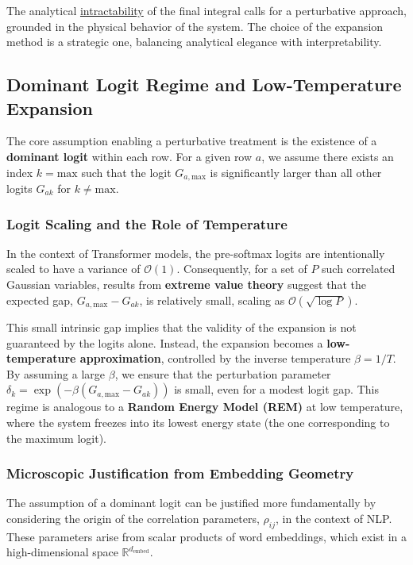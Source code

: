 \documentclass[12pt]{article}
\begin{document}
The analytical \underline{intractability} of the final integral calls for a perturbative approach, grounded in the physical behavior of the system. The choice of the expansion method is a strategic one, balancing analytical elegance with interpretability.

\subsection{Dominant Logit Regime and Low-Temperature Expansion}
The core assumption enabling a perturbative treatment is the existence of a \textbf{dominant logit} within each row. For a given row $a$, we assume there exists an index $k=\text{max}$ such that the logit $G_{a, \text{max}}$ is significantly larger than all other logits $G_{ak}$ for $k \neq \text{max}$.

\subsubsection*{Logit Scaling and the Role of Temperature}
In the context of Transformer models, the pre-softmax logits are intentionally scaled to have a variance of $\mathcal{O}(1)$. Consequently, for a set of $P$ such correlated Gaussian variables, results from \textbf{extreme value theory} suggest that the expected gap, $G_{a, \text{max}} - G_{ak}$, is relatively small, scaling as $\mathcal{O}(\sqrt{\log P})$.

This small intrinsic gap implies that the validity of the expansion is not guaranteed by the logits alone. Instead, the expansion becomes a \textbf{low-temperature approximation}, controlled by the inverse temperature $\beta = 1/T$. By assuming a large $\beta$, we ensure that the perturbation parameter $\delta_k = \exp(-\beta(G_{a, \text{max}} - G_{ak}))$ is small, even for a modest logit gap. This regime is analogous to a \textbf{Random Energy Model (REM)} at low temperature, where the system freezes into its lowest energy state (the one corresponding to the maximum logit).
\subsubsection*{Microscopic Justification from Embedding Geometry}
The assumption of a dominant logit can be justified more fundamentally by considering the origin of the correlation parameters, $\rho_{ij}$, in the context of NLP. These parameters arise from scalar products of word embeddings, which exist in a high-dimensional space $\mathbb{R}^{d_{\text{embed}}}$.
\end{document}
